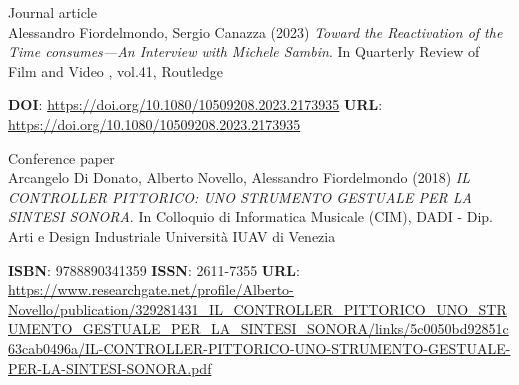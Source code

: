 \documentclass[7pt,a4paper]{article}
\begin{document}
\begin{mdframed}[
    backgroundcolor=white,
    linecolor=white,
    linewidth=0pt,
    innerleftmargin=6pt,
    innerrightmargin=6pt,
    innertopmargin=6pt,
    innerbottommargin=6pt,
    skipabove=0pt,
    skipbelow=0pt
]

\scriptsize Journal article\\
\normalsize Alessandro Fiordelmondo, Sergio Canazza
(2023) \textit{Toward the Reactivation of the Time consumes—An Interview with Michele Sambin}.
In
 Quarterly Review of Film and Video
, vol.41, Routledge

\vspace{0.1cm}
\scriptsize  \textbf{DOI}: \href{https://doi.org/10.1080/10509208.2023.2173935}{https://doi.org/10.1080/10509208.2023.2173935}
\scriptsize 
\scriptsize 
\scriptsize  \textbf{URL}: \href{https://doi.org/10.1080/10509208.2023.2173935}{https://doi.org/10.1080/10509208.2023.2173935}
\vspace{0.15cm}
\end{mdframed}




\begin{mdframed}[
    backgroundcolor=entrygray,
    linecolor=entrygray,
    linewidth=0pt,
    innerleftmargin=6pt,
    innerrightmargin=6pt,
    innertopmargin=6pt,
    innerbottommargin=6pt,
    skipabove=0pt,
    skipbelow=0pt
]

\scriptsize Conference paper\\
\normalsize Arcangelo Di Donato, Alberto Novello, Alessandro Fiordelmondo
(2018) \textit{IL CONTROLLER PITTORICO: UNO STRUMENTO GESTUALE PER LA SINTESI SONORA}.
In
Colloquio di Informatica Musicale (CIM), DADI - Dip. Arti e Design Industriale Università IUAV di Venezia

\vspace{0.1cm}
\scriptsize 
\scriptsize  \textbf{ISBN}: 9788890341359 
\scriptsize  \textbf{ISSN}: 2611-7355 
\scriptsize  \textbf{URL}: \href{https://www.researchgate.net/profile/Alberto-Novello/publication/329281431_IL_CONTROLLER_PITTORICO_UNO_STRUMENTO_GESTUALE_PER_LA_SINTESI_SONORA/links/5c0050bd92851c63cab0496a/IL-CONTROLLER-PITTORICO-UNO-STRUMENTO-GESTUALE-PER-LA-SINTESI-SONORA.pdf}{https://www.researchgate.net/profile/Alberto-Novello/publication/329281431\_IL\_CONTROLLER\_PITTORICO\_UNO\_STRUMENTO\_GESTUALE\_PER\_LA\_SINTESI\_SONORA/links/5c0050bd92851c63cab0496a/IL-CONTROLLER-PITTORICO-UNO-STRUMENTO-GESTUALE-PER-LA-SINTESI-SONORA.pdf}
\vspace{0.15cm}
\end{mdframed}
\end{document}

